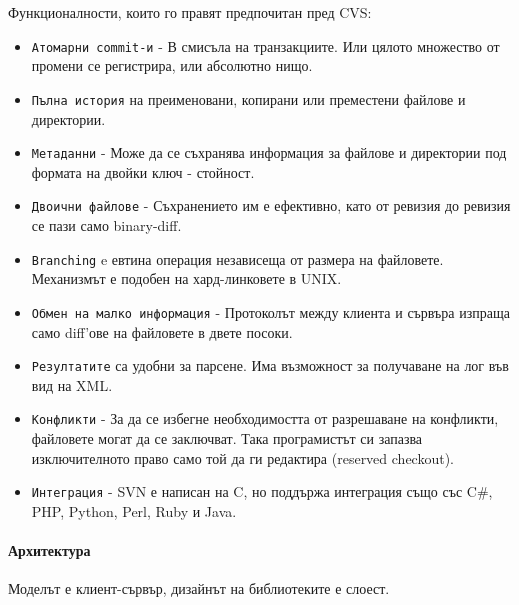 \documentclass[a4paper]{article}
\begin{document}
    Функционалности, които го правят предпочитан пред CVS:
    \begin{itemize}
      \item \texttt{Атомарни commit-и} - В смисъла на транзакциите. Или цялото множество от промени се регистрира, или абсолютно нищо.
      \item \texttt{Пълна история} на преименовани, копирани или преместени файлове и директории.
      \item \texttt{Метаданни} - Може да се съхранява информация за файлове и директории под формата на двойки ключ - стойност.
      \item \texttt{Двоични файлове} - Съхранението им е ефективно, като от ревизия до ревизия се пази само binary-diff.
      \item \texttt{Branching} e евтина операция независеща от размера на файловете. Механизмът е подобен на хард-линковете в UNIX.
      \item \texttt{Обмен на малко информация} - Протоколът между клиента и сървъра изпраща само diff'ове на файловете в двете посоки.
      \item \texttt{Резултатите} са удобни за парсене. Има възможност за получаване на лог във вид на XML.
      \item \texttt{Конфликти} - За да се избегне необходимостта от разрешаване на конфликти, файловете могат да се заключват. Така програмистът си запазва изключителното право само той да ги редактира (reserved checkout).
      \item \texttt{Интеграция} - SVN е написан на C, но поддържа интеграция също със C\#, PHP, Python, Perl, Ruby и Java.
    \end{itemize}

    \paragraph{Архитектура}
    Моделът е клиент-сървър, дизайнът на библиотеките е слоест.
\end{document}
